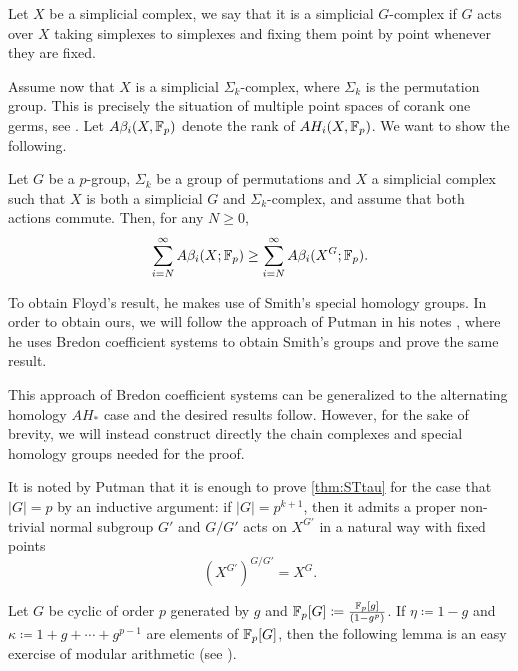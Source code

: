 \documentclass[a4paper,12pt]{amsart}
\begin{document}
\begin{definition}
    Let $X$ be a simplicial complex, we say that it is a simplicial $G$-complex if $G$ acts over $X$ taking simplexes to simplexes and fixing them point by point whenever they are fixed.
\end{definition}

Assume now that $X$ is a simplicial $\Sigma_k$-complex, where $\Sigma_k$ is the permutation group. This is precisely the situation of multiple point spaces of corank one germs, see \cite[Section 5]{Houston2007}.
Let $A\beta_i(X,\mathbb{F}_p)$ denote the rank of $AH_i(X,\mathbb{F}_p)$. We want to show the following.

\begin{theorem}\label{thm:STtau}
Let $G$ be a $p$-group, $\Sigma_k$ be a group of permutations and $X$ a simplicial complex such that $X$ is both a simplicial $G$ and $\Sigma_k$-complex, and assume that both actions commute. Then, for any $N\geq0$,
\[ \sum_{i=N}^\infty A\beta_i(X;\mathbb{F}_p)\geq\sum_{i=N}^\infty A\beta_i(X^{G};\mathbb{F}_p).\]
\end{theorem}
To obtain Floyd's result, he makes use of Smith's special homology groups.
In order to obtain ours, we will follow the approach of Putman in his notes \cite{PutmanSTnotes}, where he uses Bredon coefficient systems to obtain Smith's groups and prove the same result.

This approach of Bredon coefficient systems can be generalized to the alternating homology $AH_*$ case and the desired results follow.
However, for the sake of brevity, we will instead  construct directly the chain complexes and special homology groups needed for the proof.

\begin{remark}
    It is noted by Putman that it is enough to prove \cref{thm:STtau} for the case that $|G| = p$ by an inductive argument: if $|G| = p^{k+1}$, then it admits a proper non-trivial normal subgroup $G'$ and $G/G'$ acts on $X^{G'}$ in a natural way with fixed points
    $$\left(X^{G'}\right)^{G/G'} = X^G.$$
\end{remark}

Let $G$ be cyclic of order $p$ generated by $g$ and $\mathbb{F}_p [G] \coloneqq\frac{\mathbb{F}_p[g]}{(1-g^p)}$.
If $\eta \coloneqq 1 - g$ and $\kappa \coloneqq 1 + g + \cdots + g^{p-1}$ are elements of $\mathbb{F}_p[G]$, then the following lemma is an easy exercise of modular arithmetic (see \cite[Lemmas 4.1 to 4.3]{PutmanSTnotes}).

\end{document}
